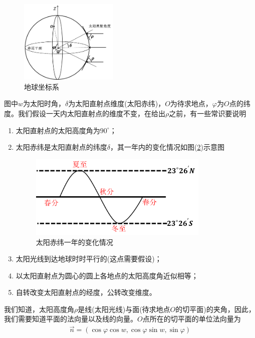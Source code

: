			\begin{figure}[H]
			\centering
			\includegraphics[height=4cm]{images/Earth_coordinate_system.jpg}
			\caption{地球坐标系}
			\label{fig:地球坐标系}
			\end{figure}
            图中$w$为太阳时角，$\delta$为太阳直射点维度(太阳赤纬)，$O$为待求地点，$\varphi$为$O$点的纬度。我们假设一天内太阳直射点的维度不变，在给出$\rho$之前，有一些常识要说明
            \begin{enumerate}
            \item 太阳直射点的太阳高度角为$90^\circ$；
            \item 太阳赤纬是太阳直射点的纬度$\delta$，其一年内的变化情况如图(\ref{fig:太阳赤纬一年的变化情况})示意图
			\begin{figure}[H]
			\centering
			\includegraphics[height=4cm]{images/Changes_in_the_sun_declination.jpg}
			\caption{太阳赤纬一年的变化情况}
			\label{fig:太阳赤纬一年的变化情况}
			\end{figure}
            \item 太阳光线到达地球时时平行的(这点需要假设)；
            \item 以太阳直射点为圆心的圆上各地点的太阳高度角近似相等；
            \item 自转改变太阳直射点的经度，公转改变维度。
            \end{enumerate}
            \par
            我们知道，太阳高度角$\rho$是线(太阳光线)与面(待求地点$O$的切平面)的夹角，因此，我们需要知道平面的法向量以及线的向量。$O$点所在的切平面的单位法向量为
            \begin{align*}
            \vec{n} = (\cos\varphi\cos w,\cos\varphi\sin w,\sin\varphi)
            \end{align*}
